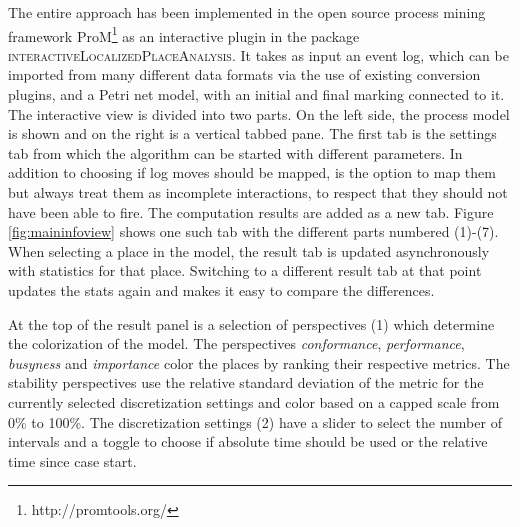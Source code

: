 The entire approach has been implemented in the open source process mining framework ProM\footnote{http://promtools.org/} as an interactive plugin in the package \textsc{interactiveLocalizedPlaceAnalysis}. It takes as input an event log, which can be imported from many different data formats via the use of existing conversion plugins, and a Petri net model, with an initial and final marking connected to it. The interactive view is divided into two parts. On the left side, the process model is shown and on the right is a vertical tabbed pane. The first tab is the settings tab from which the algorithm can be started with different parameters. In addition to choosing if log moves should be mapped, is the option to map them but always treat them as incomplete interactions, to respect that they should not have been able to fire. The computation results are added as a new tab. Figure \ref{fig:maininfoview} shows one such tab with the different parts numbered (1)-(7). When selecting a place in the model, the result tab is updated asynchronously with statistics for that place. Switching to a different result tab at that point updates the stats again and makes it easy to compare the differences.

At the top of the result panel is a selection of perspectives (1) which determine the colorization of the model. The perspectives \textit{conformance}, \textit{performance}, \textit{busyness} and \textit{importance} color the places by ranking their respective metrics. The stability perspectives use the relative standard deviation of the metric for the currently selected discretization settings and color based on a capped scale from 0\% to 100\%.
The discretization settings (2) have a slider to select the number of intervals and a toggle to choose if absolute time should be used or the relative time since case start.

